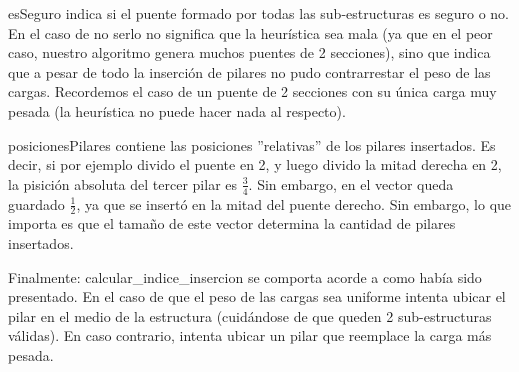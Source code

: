 esSeguro indica si el puente formado por todas las sub-estructuras es seguro o no. En el caso de no serlo no significa
que la heurística sea mala (ya que en el peor caso, nuestro algoritmo genera muchos puentes de 2 secciones), sino
que indica que a pesar de todo la inserción de pilares no pudo contrarrestar el peso de las cargas. Recordemos
el caso de un puente de 2 secciones con su única carga muy pesada (la heurística no puede hacer nada al respecto).

posicionesPilares contiene las posiciones ''relativas'' de los pilares insertados. Es decir, si por ejemplo divido el puente
en 2, y luego divido la mitad derecha en 2, la pisición absoluta del tercer pilar es $\frac{3}{4}$. Sin embargo, en el 
vector queda guardado $\frac{1}{2}$, ya que se insertó en la mitad del puente derecho. Sin embargo, lo que importa es que
el tamaño de este vector determina la cantidad de pilares insertados.

Finalmente: calcular\_indice\_insercion se comporta acorde a como había sido presentado. En el caso de que el peso de las
cargas sea uniforme intenta ubicar el pilar en el medio de la estructura (cuidándose de que queden 2 sub-estructuras
válidas). En caso contrario, intenta ubicar un pilar que reemplace la carga más pesada.